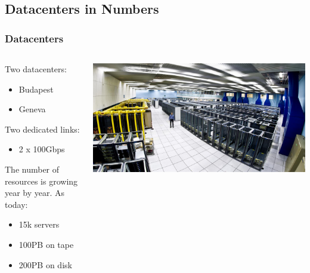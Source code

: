 \documentclass[aspectratio=169]{beamer}
\begin{document}
\subsection{Datacenters in Numbers}
\begin{frame}
    \frametitle{Datacenters}
    \begin{minipage}[t]{0.95\textwidth}
        \begin{columns}[T]
            \begin{column}{0.5\textwidth}
                Two datacenters:
                \begin{itemize}
                    \item Budapest
                    \item Geneva
                \end{itemize}
                Two dedicated links:
                \begin{itemize}
                    \item 2 x 100Gbps
                \end{itemize}
                \vspace{0.1in} 
                The number of resources is growing year by year.
                As today:
                \begin{itemize}
                    \item 15k servers
                    \item 100PB on tape
                    \item 200PB on disk
                \end{itemize}
            \end{column}
            \begin{column}{0.5\textwidth}
                \vspace{0.2in} 
                \includegraphics[width=1.1\textwidth]{DC_overview.png}
            \end{column}
        \end{columns}
    \end{minipage}
\end{frame}
\end{document}
